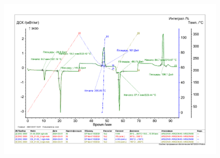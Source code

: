 \documentclass[a4paper,12pt]{article} %
\begin{document}
 \begin{figure}[H]
    \centering
    \includegraphics[width = 180 mm]{image_5.pdf}
\end{figure}
\end{document}
